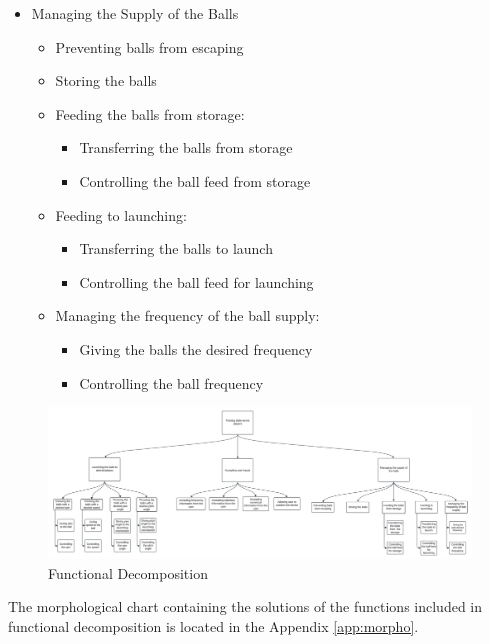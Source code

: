 \documentclass[12pt]{report}
\begin{document}
\begin{itemize}
    \item Managing the Supply of the Balls
    \begin{itemize}
        \item Preventing balls from escaping
        \item Storing the balls
        \item Feeding the balls from storage:
        \begin{itemize}
            \item Transferring the balls from storage
            \item Controlling the ball feed from storage
        \end{itemize}
        \item Feeding to launching:
        \begin{itemize}
            \item Transferring the balls to launch
            \item Controlling the ball feed for launching
        \end{itemize}
        \item Managing the frequency of the ball supply:
        \begin{itemize}
            \item Giving the balls the desired frequency
            \item Controlling the ball frequency
        \end{itemize}
    \end{itemize}
\end{itemize}

\begin{figure}[H]
    \centering
    \includegraphics[width=0.9\linewidth]{fd.jpeg}
    \caption{Functional Decomposition}
    \label{fig:fd}
\end{figure}

The morphological chart containing the solutions of the functions included in functional decomposition is located in the Appendix \ref{app:morpho}. \\
\end{document}
